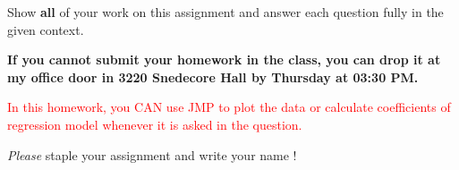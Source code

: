 \documentclass[11pt]{article}\usepackage[]{graphicx}\usepackage[]{color}
\begin{document}

\pagestyle{fancy} 

Show \textbf{all} of your work on this assignment and answer each question fully in the given context. 

\vspace{0.3cm}

\textbf{If you cannot submit your homework in the class, you can drop it at my office door in 3220 Snedecore Hall by Thursday at 03:30 PM.}

\vspace{0.3cm}

\textcolor{red}{In this homework, you CAN use JMP to plot the data or calculate coefficients of regression model whenever it is asked in the question.}
\vspace{0.3cm}

\emph{Please} staple your assignment and write your name !
\end{document}
